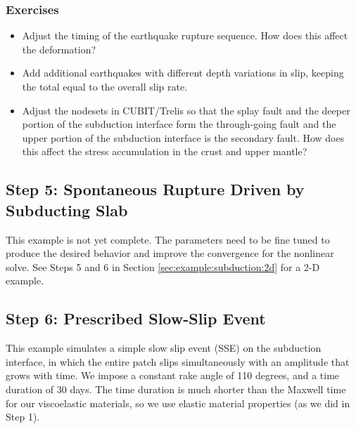 \subsubsection{Exercises}

\begin{itemize}
  \item Adjust the timing of the earthquake rupture sequence. How does
    this affect the deformation?
  \item Add additional earthquakes with different depth variations in
    slip, keeping the total equal to the overall slip rate.
  \item Adjust the nodesets in CUBIT/Trelis so that the splay fault
    and the deeper portion of the subduction interface form the
    through-going fault and the upper portion of the subduction
    interface is the secondary fault. How does this affect the stress
    accumulation in the crust and upper mantle?
\end{itemize}

\subsection{Step 5: Spontaneous Rupture Driven by Subducting Slab}

This example is not yet complete. The parameters need to be fine tuned
to produce the desired behavior and improve the convergence for the
nonlinear solve. See Steps 5 and 6 in Section
\vref{sec:example:subduction:2d} for a 2-D example.

\subsection{Step 6: Prescribed Slow-Slip Event}

This example simulates a simple slow slip event (SSE) on the
subduction interface, in which the entire patch slips simultaneously
with an amplitude that grows with time. We impose a constant rake
angle of 110 degrees, and a time duration of 30 days. The time
duration is much shorter than the Maxwell time for our viscoelastic
materials, so we use elastic material properties (as we did in Step 1).

